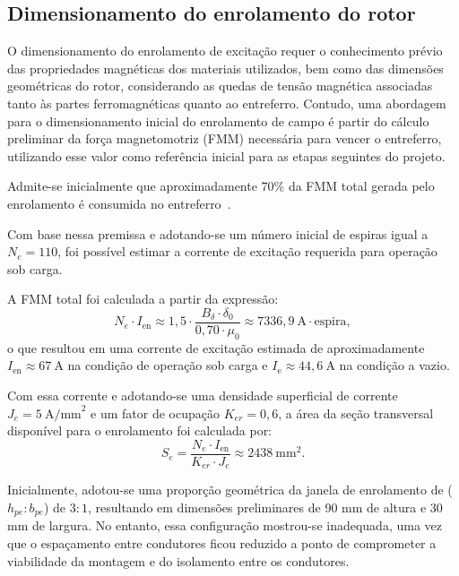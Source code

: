 \documentclass[conference]{IEEEtran}
\begin{document}

\subsection{Dimensionamento do enrolamento do rotor}
O dimensionamento do enrolamento de excitação requer o conhecimento prévio das propriedades magnéticas dos materiais utilizados, bem como das dimensões geométricas do rotor, considerando as quedas de tensão magnética associadas tanto às partes ferromagnéticas quanto ao entreferro. Contudo, uma abordagem para o dimensionamento inicial do enrolamento de campo é partir do cálculo preliminar da força magnetomotriz (FMM) necessária para vencer o entreferro, utilizando esse valor como referência inicial para as etapas seguintes do projeto.

Admite-se inicialmente que aproximadamente 70\% da FMM total gerada pelo enrolamento é consumida no entreferro~\cite{b1}. 

Com base nessa premissa e adotando-se um número inicial de espiras igual a \( N_e = 110 \), foi possível estimar a corrente de excitação requerida para operação sob carga.

A FMM total foi calculada a partir da expressão:
\begin{equation}
    N_e \cdot I_{\text{en}} \approx 1{,}5 \cdot \frac{B_\delta \cdot \delta_0}{0{,}70 \cdot \mu_0} \approx 7336{,}9 \ \text{A} \cdot \text{espira},
\end{equation}
o que resultou em uma corrente de excitação estimada de aproximadamente \( I_{\text{en}} \approx 67 \ \text{A} \) na condição de operação sob carga e \( I_{\text{e}} \approx 44,6 \ \text{A} \) na condição a vazio.

Com essa corrente e adotando-se uma densidade superficial de corrente \( J_e = 5 \ \text{A/mm}^2 \) e um fator de ocupação \( K_{er} = 0{,}6 \), a área da seção transversal disponível para o enrolamento foi calculada por:
\begin{equation}
    S_e = \frac{N_e \cdot I_{\text{en}}}{K_{er} \cdot J_e} \approx 2438 \ \text{mm}^2.
\end{equation}

Inicialmente, adotou-se uma proporção geométrica da janela de enrolamento de (\(h_{pe}:b_{pe}\)) de \(3:1\), resultando em dimensões preliminares de 90 mm de altura e 30 mm de largura. No entanto, essa configuração mostrou-se inadequada, uma vez que o espaçamento entre condutores ficou reduzido a ponto de comprometer a viabilidade da montagem e do isolamento entre os condutores.
\end{document}
